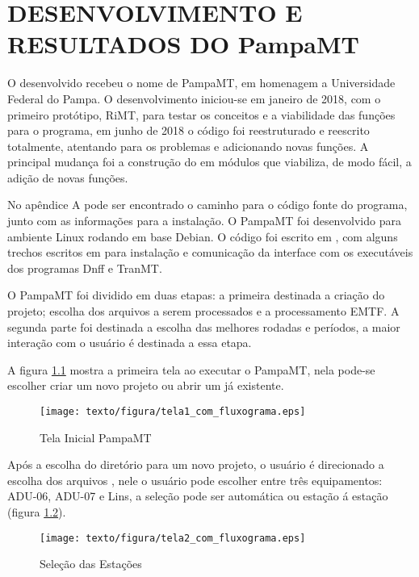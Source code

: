 \chapter{DESENVOLVIMENTO E RESULTADOS DO PampaMT}

    O  desenvolvido recebeu o nome de PampaMT, em homenagem a Universidade Federal do Pampa. O desenvolvimento iniciou-se em janeiro de 2018, com o primeiro protótipo, RiMT, para testar os conceitos e a viabilidade das funções para o programa, em junho de 2018 o código foi reestruturado e reescrito totalmente, atentando para os problemas e adicionando novas funções. A principal mudança foi a construção do  em módulos que viabiliza, de modo fácil, a adição de novas funções.
    
    No apêndice A pode ser encontrado o caminho para o código fonte do programa, junto com as informações para a instalação. O PampaMT foi desenvolvido para ambiente Linux rodando em base Debian. O código foi escrito em \Python, com alguns trechos escritos em \Shell{} para instalação e comunicação da interface com os executáveis dos programas Dnff e TranMT.
    
    O PampaMT foi dividido em duas etapas: a primeira destinada a criação do projeto; escolha dos arquivos a serem processados e a processamento EMTF. A segunda parte foi destinada a escolha das melhores rodadas e períodos, a maior interação com o usuário é destinada a essa etapa. 
    
    A figura \ref{tela_inicial} mostra a primeira tela ao executar o PampaMT, nela pode-se escolher criar um novo projeto ou abrir um já existente.
    
    \begin{figure}[H]
        \caption{Tela Inicial PampaMT}
            \begin{center}
                \texttt{[image: texto/figura/tela1\_com\_fluxograma.eps]}
            \end{center}
        \label{tela_inicial}
    \end{figure}
    
     Após a escolha do diretório para um novo projeto, o usuário é direcionado a escolha dos arquivos , nele o usuário pode escolher entre três equipamentos: ADU-06, ADU-07 e Lins, a seleção pode ser automática ou estação á estação (figura \ref{tela_sel_site}). 
    
    \begin{figure}[H]
        \caption{Seleção das Estações}
            \begin{center}
                \texttt{[image: texto/figura/tela2\_com\_fluxograma.eps]}
            \end{center}
        \label{tela_sel_site}
    \end{figure}
    
